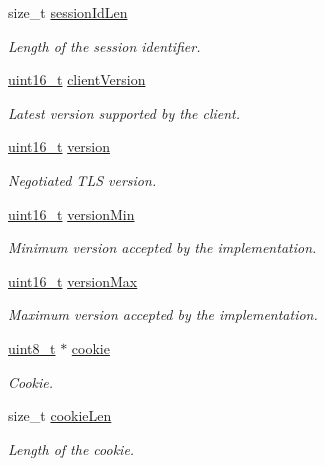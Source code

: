 \begin{DoxyCompactItemize}
size\+\_\+t \hyperlink{struct__TlsContext_a1a592ab1d273039d45b71b0356148bb2}{session\+Id\+Len}
\begin{DoxyCompactList}\small\item\em Length of the session identifier. \end{DoxyCompactList}\item 
\hyperlink{stdint_8h_a273cf69d639a59973b6019625df33e30}{uint16\+\_\+t} \hyperlink{struct__TlsContext_a6e780a4b6023b1ee78049228aca2a392}{client\+Version}
\begin{DoxyCompactList}\small\item\em Latest version supported by the client. \end{DoxyCompactList}\item 
\hyperlink{stdint_8h_a273cf69d639a59973b6019625df33e30}{uint16\+\_\+t} \hyperlink{struct__TlsContext_a472d3c53bc6ef0e507b600782059b969}{version}
\begin{DoxyCompactList}\small\item\em Negotiated T\+LS version. \end{DoxyCompactList}\item 
\hyperlink{stdint_8h_a273cf69d639a59973b6019625df33e30}{uint16\+\_\+t} \hyperlink{struct__TlsContext_abf0de5686d025b3399ff395da071e1cd}{version\+Min}
\begin{DoxyCompactList}\small\item\em Minimum version accepted by the implementation. \end{DoxyCompactList}\item 
\hyperlink{stdint_8h_a273cf69d639a59973b6019625df33e30}{uint16\+\_\+t} \hyperlink{struct__TlsContext_ace8ccb768f41e42901036f6a4baeb35d}{version\+Max}
\begin{DoxyCompactList}\small\item\em Maximum version accepted by the implementation. \end{DoxyCompactList}\item 
\hyperlink{stdint_8h_aba7bc1797add20fe3efdf37ced1182c5}{uint8\+\_\+t} $\ast$ \hyperlink{struct__TlsContext_ac2bc6514bc9c6ba63956098a4d15b76a}{cookie}
\begin{DoxyCompactList}\small\item\em Cookie. \end{DoxyCompactList}\item 
size\+\_\+t \hyperlink{struct__TlsContext_a1dd10766ce7b503cb08e2ddc8ab18bca}{cookie\+Len}
\begin{DoxyCompactList}\small\item\em Length of the cookie. \end{DoxyCompactList}\item 

\end{DoxyCompactItemize}
